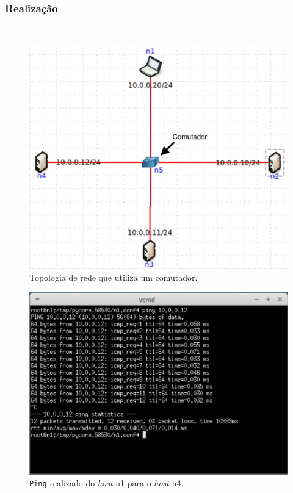 \documentclass{llncs}
\begin{document}
\subsubsection{Realização}\rule[-10pt]{0pt}{10pt}\\

\begin{figure}
  \begin{center}
	  \includegraphics[scale=0.2]{./imagens/rede_23_comutador.png} 
  \end{center}
	\caption{Topologia de rede que utiliza um comutador.}
  \label{fig:rede_23_comutador}
\end{figure} 

\begin{figure}
  \begin{center}
	  \includegraphics[scale=0.3]{./imagens/n1_comutador.png} 
  \end{center}
	\caption{\texttt{Ping} realizado do \textit{host} n1 para o \textit{host} n4.}
  \label{fig:n1_comutador}
\end{figure} 
\end{document}
